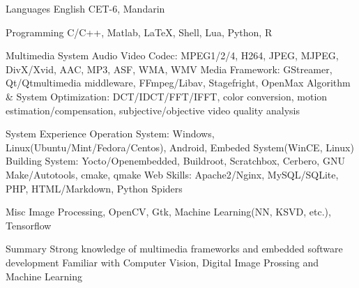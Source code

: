 
\begin{cvskills}
  \cvskill
    {Languages} %
    {English CET-6, Mandarin} %

  \cvskill
    {Programming} %
    {C/C++, Matlab, LaTeX, Shell, Lua, Python, R} %

  \cvskill
    {Multimedia System} %
    {Audio Video Codec: MPEG1/2/4, H264, JPEG, MJPEG, DivX/Xvid, AAC, MP3, ASF, WMA, WMV \newline
    Media Framework: GStreamer, Qt/Qtmultimedia middleware, FFmpeg/Libav, Stagefright, OpenMax \newline
    Algorithm \& System Optimization: DCT/IDCT/FFT/IFFT, color conversion, \newline motion estimation/compensation, subjective/objective video quality analysis} %

  \cvskill
    {System Experience} %
    {Operation System: Windows, Linux(Ubuntu/Mint/Fedora/Centos), Android, \newline
    Embeded System(WinCE, Linux) \newline
    Building System: Yocto/Openembedded, Buildroot, Scratchbox, Cerbero, \newline
    GNU Make/Autotools, cmake, qmake \newline
    Web Skills: Apache2/Nginx, MySQL/SQLite, PHP, HTML/Markdown, Python Spiders} %

  \cvskill
    {Misc} %
    {Image Processing, OpenCV, Gtk, Machine Learning(NN, KSVD, etc.), Tensorflow}

  \cvskill
    {Summary} %
    {Strong knowledge of multimedia frameworks and embedded software development \newline
     Familiar with Computer Vision, Digital Image Prossing and Machine Learning}

\end{cvskills}
